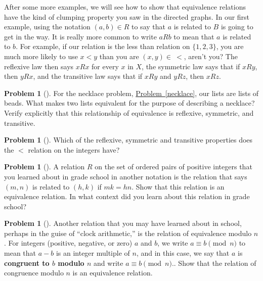 \documentclass[10pt,]{book}
\newcommand{\terminology}[1]{\textbf{#1}}
\theoremstyle{plain}
\theoremstyle{definition}
\newtheorem{activity}[project]{Problem}
\theoremstyle{definition}
\numberwithin{equation}{chapter}
\newcommand{\lt}{<}
\begin{document}
\par
After some more examples, we will see how to show that equivalence relations have the kind of clumping property you saw in the directed graphs. In our first example, using the notation \((a,b) \in R\) to say that \(a\) is related to \(B\) is going to get in the way. It is really more common to write \(a
R b\) to mean that \(a\) is related to \(b\). For example, if our relation is the less than relation on \(\{1,2,3\}\), you are much more likely to use \(x\lt y\) than you are \((x,y)\in \ \lt\), aren't you? The reflexive law then says \(xRx\) for every \(x\) in \(X\), the symmetric law says that if \(xRy\), then \(yRx\), and the transitive law says that if \(xRy\) and \(yRz\), then \(xRz\).%
\begin{activity}[]\marginsymbol[-1em]{} \label{nchoosekanotherway}
For the necklace problem, \hyperref[necklace]{Problem~\ref{necklace}}, our lists are lists of beads. What makes two lists equivalent for the purpose of describing a necklace? Verify explicitly that this relationship of equivalence is reflexive, symmetric, and transitive.%
\end{activity}
\begin{activity}[]\marginsymbol[-1em]{} \label{activity-348}
Which of the reflexive, symmetric and transitive properties does the \(\lt\) relation on the integers have?%
\end{activity}
\begin{activity}[]\marginsymbol[-1em]{} \label{activity-349}
A relation \(R\) on the set of ordered pairs of positive integers that you learned about in grade school in another notation is the relation that says \((m,n)\) is related to \((h,k)\) if \(mk =hn\). Show that this relation is an equivalence relation. In what context did you learn about this relation in grade school?%
\end{activity}
\begin{activity}[]\marginsymbol[-1em]{} \label{activity-350}
Another relation that you may have learned about in school, perhaps in the guise of ``clock arithmetic,'' is the relation of equivalence modulo \(n\). For integers (positive, negative, or zero) \(a\) and \(b\), we write \(a
\equiv b \pmod{n}\) to mean that \(a-b\) is an integer multiple of \(n\), and in this case, we say that \(a\) is \terminology{congruent to \(b\) modulo \(n\)} and write \(a\equiv b \pmod{n}\).. Show that the relation of congruence modulo \(n\) is an equivalence relation.%
\end{activity}
\end{document}
